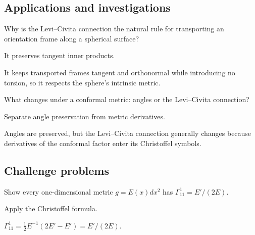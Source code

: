 \subsection*{Applications and investigations}

\begin{exercise}\label{exr:vii22-ped-13}
Why is the Levi--Civita connection the natural rule for transporting an orientation frame along a spherical surface?
\end{exercise}

\begin{hint}
It preserves tangent inner products.
\end{hint}

\begin{solution}
It keeps transported frames tangent and orthonormal while introducing no torsion, so it respects the sphere's intrinsic metric.
\end{solution}

\begin{exercise}\label{exr:vii22-ped-14}
What changes under a conformal metric: angles or the Levi--Civita connection?
\end{exercise}

\begin{hint}
Separate angle preservation from metric derivatives.
\end{hint}

\begin{solution}
Angles are preserved, but the Levi--Civita connection generally changes because derivatives of the conformal factor enter its Christoffel symbols.
\end{solution}

\subsection*{Challenge problems}

\begin{exercise}\label{exr:vii22-ped-15}
Show every one-dimensional metric \(g=E(x)dx^2\) has \(\Gamma^1_{11}=E'/(2E)\).
\end{exercise}

\begin{hint}
Apply the Christoffel formula.
\end{hint}

\begin{solution}
\(\Gamma^1_{11}=\tfrac12 E^{-1}(2E'-E')=E'/(2E)\).
\end{solution}

